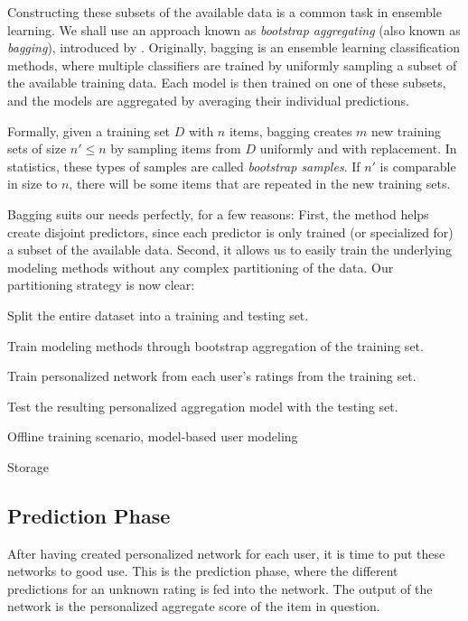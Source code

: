 Constructing these subsets of the available data is a common task in ensemble learning.
We shall use an approach known as  \emph{bootstrap aggregating} (also known as \emph{bagging}),
introduced by \cite{Breiman1996}.
Originally, bagging is an ensemble learning classification methods, where multiple classifiers are 
trained by uniformly sampling a subset of the available training data. 
Each model is then trained on one of these subsets, and the models are aggregated by averaging their individual predictions.

Formally, given a training set $D$ with $n$ items, bagging creates $m$ new training sets of size $n' \leq n$ by sampling
items from $D$ uniformly and with replacement. 
In statistics, these types of samples are called \emph{bootstrap samples}.
If $n'$ is comparable in size to $n$, there will be some items
that are repeated in the new training sets.

Bagging suits our needs perfectly, for a few reasons: First, the method helps create disjoint predictors, 
since each predictor is only trained (or specialized for) a subset of the available data.
Second, it allows us to easily train the underlying modeling methods without any complex partitioning of the data.
Our partitioning strategy is now clear:

\begin{enumerate*}
  \item Split the entire dataset into a training and testing set.
  \item Train modeling methods through bootstrap aggregation of the training set.
  \item Train personalized network from each user's ratings from the training set.
  \item Test the resulting personalized aggregation model with the testing set.
\end{enumerate*}







Offline training scenario, model-based user modeling

Storage




\subsection{Prediction Phase}

After having created personalized network for each user, it is time to put these networks to good use.
This is the prediction phase, where the different predictions for an unknown rating is fed into the network.
The output of the network is the personalized aggregate score of the item in question.


